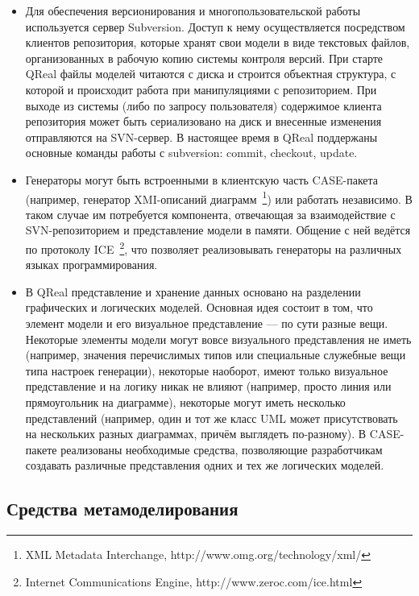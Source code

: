 \documentclass[a4paper]{article}
\begin{document}
\begin{itemize}
  \item Для обеспечения версионирования и многопользовательской работы используется сервер Subversion. Доступ к нему осуществляется посредством клиентов репозитория, которые хранят свои модели в виде текстовых файлов, организованных в рабочую копию системы контроля версий. При старте QReal файлы моделей читаются с диска и строится объектная структура, с которой и происходит работа при манипуляциями с репозиторием. При выходе из системы (либо по запросу пользователя) содержимое клиента репозитория может быть сериализовано на диск и внесенные изменения отправляются на SVN-сервер. В настоящее время в QReal поддержаны основные команды работы с subversion: commit, checkout, update. 
  \item Генераторы могут быть встроенными в клиентскую часть CASE-пакета (например, генератор XMI-описаний диаграмм~\footnote{XML Metadata Interchange, http://www.omg.org/technology/xml/}) или работать независимо. В таком случае им потребуется компонента, отвечающая за взаимодействие с SVN-репозиторием и представление модели в памяти. Общение с ней ведётся по протоколу ICE~\footnote{Internet Communications Engine, http://www.zeroc.com/ice.html}, что позволяет реализовывать генераторы на различных языках программирования.
  \item В QReal представление и хранение данных основано на разделении графических и логических моделей. Основная идея состоит в том, что элемент модели и его визуальное представление --- по сути разные вещи. Некоторые элементы модели могут вовсе визуального представления не иметь (например, значения перечислимых типов или специальные служебные вещи типа настроек генерации), некоторые наоборот, имеют только визуальное представление и на логику никак не влияют (например, просто линия или прямоугольник на диаграмме), некоторые могут иметь несколько представлений (например, один и тот же класс UML может присутствовать на нескольких разных диаграммах, причём выглядеть по-разному). В CASE-пакете реализованы необходимые средства, позволяющие разработчикам создавать различные представления одних и тех же логических моделей.
\end{itemize}


\subsection{Средства метамоделирования}
\end{document}

